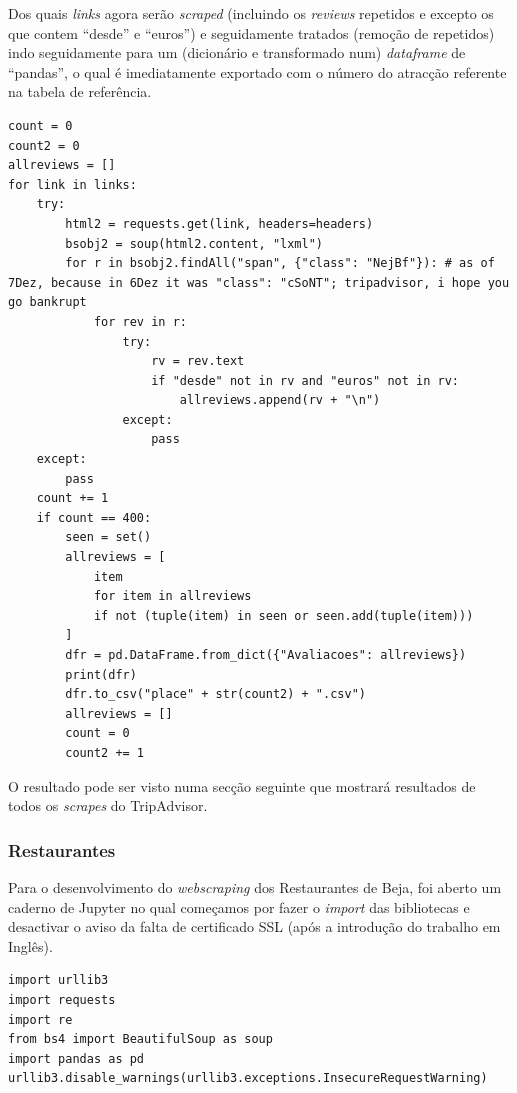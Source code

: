 \documentclass[a4paper,10pt]{article}
\begin{document}
\newpage

Dos quais \textit{links} agora serão \textit{scraped} (incluindo os \textit{reviews} repetidos e excepto os que contem ``desde'' e ``euros'') e seguidamente tratados (remoção de repetidos) indo seguidamente para um (dicionário e transformado num) \textit{dataframe} de ``pandas'', o qual é imediatamente exportado com o número do atracção referente na tabela de referência.

\begin{verbatim}
count = 0
count2 = 0
allreviews = []
for link in links:
    try:
        html2 = requests.get(link, headers=headers)
        bsobj2 = soup(html2.content, "lxml")
        for r in bsobj2.findAll("span", {"class": "NejBf"}): # as of 7Dez, because in 6Dez it was "class": "cSoNT"; tripadvisor, i hope you go bankrupt
            for rev in r:
                try:
                    rv = rev.text
                    if "desde" not in rv and "euros" not in rv:
                        allreviews.append(rv + "\n")
                except:
                    pass
    except:
        pass
    count += 1
    if count == 400:
        seen = set()
        allreviews = [
            item
            for item in allreviews
            if not (tuple(item) in seen or seen.add(tuple(item)))
        ]
        dfr = pd.DataFrame.from_dict({"Avaliacoes": allreviews})
        print(dfr)
        dfr.to_csv("place" + str(count2) + ".csv")
        allreviews = []
        count = 0
        count2 += 1
\end{verbatim}

O resultado pode ser visto numa secção seguinte que mostrará resultados de todos os \textit{scrapes} do TripAdvisor.

\newpage

\subsubsection{Restaurantes}

Para o desenvolvimento do \textit{webscraping} dos Restaurantes de Beja, foi aberto um caderno de Jupyter no qual começamos por fazer o \textit{import} das bibliotecas e desactivar o aviso da falta de certificado SSL (após a introdução do trabalho em Inglês).

\begin{verbatim}
import urllib3
import requests
import re
from bs4 import BeautifulSoup as soup
import pandas as pd
urllib3.disable_warnings(urllib3.exceptions.InsecureRequestWarning)
\end{verbatim}
\end{document}
